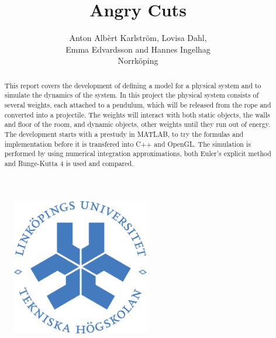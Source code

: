 \documentclass[a4paper,12pt,twoside,english]{article}
\title{Angry Cuts}
\author{Anton Alb\`{e}rt Karlstr\"{o}m, Lovisa Dahl, \\Emma Edvardsson
 and Hannes Ingelhag \\Norrk\"{o}ping}
\begin{document}


\begin{figure}
\begin{center}
\includegraphics[width=6cm]{bilder/LiTH_sigill_col.png} 
\end{center}
\end{figure}

\maketitle
{}

\newpage
\begin{abstract}
This report covers the development of defining a model for a physical system and to simulate the dynamics of the system. In this project the physical system consists of several weights, each attached to a pendulum, which will be released from the rope and converted into a projectile. The weights will interact with both static objects, the walls and floor of the room, and dynamic objects, other weights until they run out of energy.
The development starts with a prestudy in MATLAB, to try the formulas and implementation before it is transfered into C++ and OpenGL. The simulation is performed by using numerical integration approximations, both Euler's explicit method and Runge-Kutta 4 is used and compared. 
\vfill
\end{abstract}


\newpage
\end{document}
